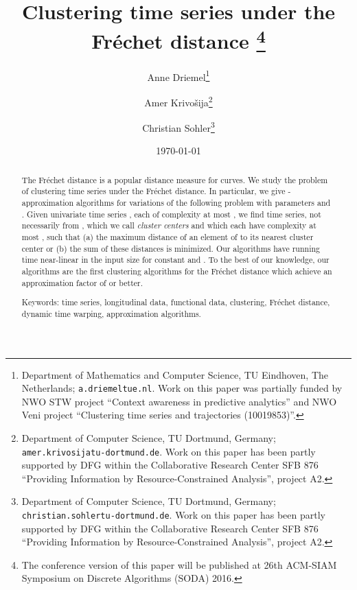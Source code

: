 \documentclass[11pt, letter]{article}
\newcommand{\Frechet}{Fr\'echet\xspace}
\newcommand{\atgen}{\symbol{'100}}
\begin{document}
\title{Clustering time series under the \Frechet distance
\thanks{The conference version of this paper will be published at 26th ACM-SIAM Symposium on Discrete Algorithms (SODA) 2016.}
}

\author{Anne Driemel\thanks{Department of Mathematics and Computer Science, TU Eindhoven, The
   Netherlands; 
      \texttt{a.driemel}\hspace{0cm}\texttt{\atgen{}tue.nl}. 
      Work on this paper was partially funded by NWO STW project ``Context
      awareness in predictive analytics'' and NWO Veni project ``Clustering time
      series and trajectories (10019853)''. } \and Amer Krivo\v{s}ija\thanks{Department of Computer Science, TU Dortmund, Germany; 
      \texttt{amer.krivosija}\hspace{0cm}\texttt{\atgen{}tu-dortmund.de}. Work on this paper has been partly supported by DFG within the Collaborative Research Center SFB 876 ``Providing Information by Resource-Constrained Analysis'', project A2.} \and Christian Sohler\thanks{Department of Computer Science, TU Dortmund, Germany; 
      \texttt{christian.sohler}\hspace{0cm}\texttt{\atgen{}tu-dortmund.de}. Work on this paper has been partly supported by DFG within the Collaborative Research Center SFB 876 ``Providing Information by Resource-Constrained Analysis'', project A2.} }

\date{\today}

\maketitle

\begin{abstract}
The \Frechet{} distance is a popular distance measure for curves. We study the problem of clustering time series under the \Frechet{} distance.  In particular, we give -approximation algorithms for variations of the following problem with parameters  and .  Given  univariate time series , each of complexity at most , we find  time series, not necessarily from , which we call \emph{cluster centers} and which each have complexity at most , such that (a) the maximum distance of an element of  to its nearest cluster center or (b) the sum of these distances is minimized.  Our algorithms have running time near-linear in the input size for constant  and .  To the best of our knowledge, our algorithms are the first clustering algorithms for the \Frechet{} distance which achieve an approximation factor of  or better. 

Keywords: time series, longitudinal data, functional data, clustering, \Frechet{} distance, dynamic time warping, approximation algorithms.
\end{abstract}
\vfill
\thispagestyle{empty}
\pagebreak
\setcounter{page}{1}
\end{document}
